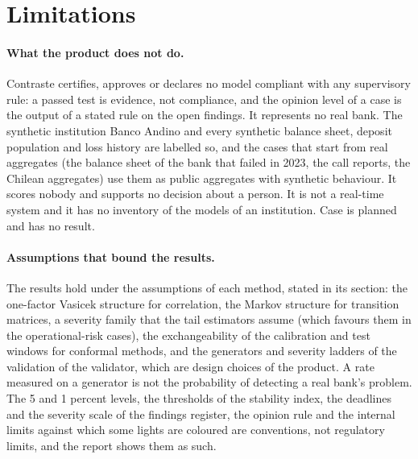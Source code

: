 \section{Limitations}
\label{sec:limitations}

\paragraph{What the product does not do.} Contraste certifies, approves or declares no model compliant with any supervisory rule: a passed test is evidence, not compliance, and the opinion level of a case is the output of a stated rule on the open findings. It represents no real bank. The synthetic institution Banco Andino and every synthetic balance sheet, deposit population and loss history are labelled so, and the cases that start from real aggregates (the balance sheet of the bank that failed in 2023, the call reports, the Chilean aggregates) use them as public aggregates with synthetic behaviour. It scores nobody and supports no decision about a person. It is not a real-time system and it has no inventory of the models of an institution. Case \rsCaseNoResult{} is planned and has no result.

\paragraph{Assumptions that bound the results.} The results hold under the assumptions of each method, stated in its section: the one-factor Vasicek structure for correlation, the Markov structure for transition matrices, a severity family that the tail estimators assume (which favours them in the operational-risk cases), the exchangeability of the calibration and test windows for conformal methods, and the generators and severity ladders of the validation of the validator, which are design choices of the product. A rate measured on a generator is not the probability of detecting a real bank's problem. The 5 and 1 percent levels, the thresholds of the stability index, the deadlines and the severity scale of the findings register, the opinion rule and the internal limits against which some lights are coloured are conventions, not regulatory limits, and the report shows them as such.

